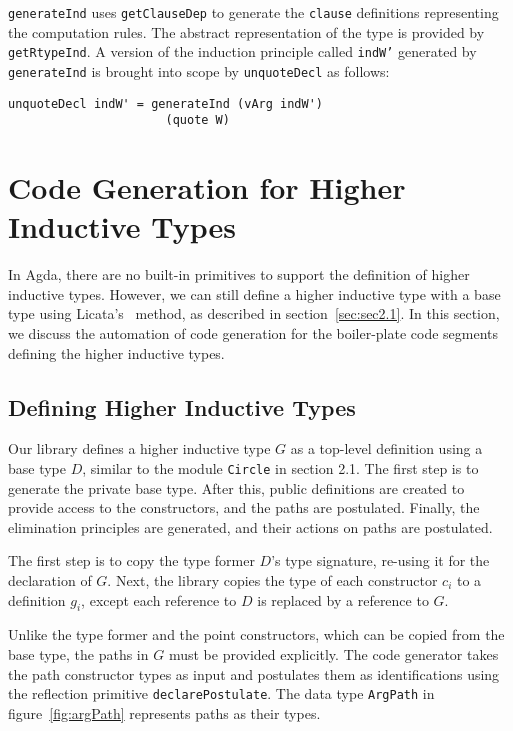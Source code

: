 \documentclass[sigplan,10pt]{acmart}
\begin{document}

{\tt generateInd} uses {\tt getClauseDep} to generate the {\tt clause} definitions representing the computation rules. The abstract representation of the type is provided by {\tt getRtypeInd}.
A version of the induction principle called {\tt indW'} generated by {\tt generateInd} is brought into scope by {\tt unquoteDecl} as follows:
\begin{center}
\begingroup
\begin{BVerbatim}
unquoteDecl indW' = generateInd (vArg indW')
                      (quote W)
\end{BVerbatim}
\endgroup
\end{center}

\section{Code Generation for Higher Inductive Types}
\label{sec:sec4}

In Agda, there are no built-in primitives to support the definition of higher inductive types.
However, we can still define a higher inductive type with a base type using Licata's~\citep{Licata-2011} method, as described in section~\ref{sec:sec2.1}.
In this section, we discuss the automation of code generation for the boiler-plate code segments defining the higher inductive types.


\subsection{Defining Higher Inductive Types}
\label{sec:sec4.1}

Our library defines a higher inductive type $G$ as a top-level definition using a base type $D$, similar to the module {\tt Circle} in section 2.1.
The first step is to generate the private base type.
After this, public definitions are created to provide access to the constructors, and the paths are postulated.
Finally, the elimination principles are generated, and their actions on paths are postulated.

The first step is to copy the type former $D$'s type signature, re-using it for the declaration of $G$.
Next, the library copies the type of each constructor $c_i$ to a definition $g_i$, except each reference to $D$ is replaced by a reference to $G$.

Unlike the type former and the point constructors, which can be copied from the base type, the paths in $G$ must be provided explicitly.
The code generator takes the path constructor types as input and postulates them as identifications using the reflection primitive {\tt declarePostulate}.
The data type {\tt ArgPath} in figure~\ref{fig:argPath} represents paths as their types.
\end{document}
